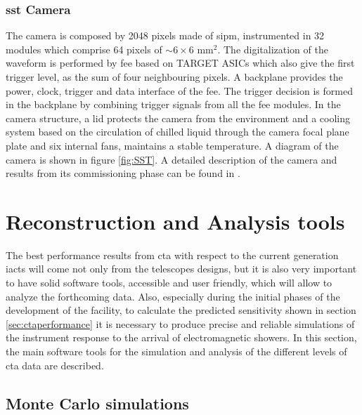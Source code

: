 \documentclass[main.tex]{subfiles}
\begin{document}
\subsubsection{\gls{sst} Camera}

The camera is composed by 2048 pixels made of \gls{sipm}, instrumented in 32 modules which comprise 64 pixels of $\sim 6\times6$ mm$^2$. The digitalization of the waveform is performed by \gls{fee} based on TARGET ASICs \cite{2017TARGETASIC} which also give the first trigger level, as the sum of four neighbouring pixels. A backplane provides the power, clock, trigger and data interface of the \gls{fee}. The trigger decision is formed in the backplane by combining trigger signals from all the \gls{fee} modules. In the camera structure, a lid protects the camera from the environment and a cooling system based on the circulation of chilled liquid through the camera focal plane plate and six internal fans, maintains a stable temperature. A diagram of the camera is shown in figure \ref{fig:SST}. A detailed description of the camera and results from its commissioning phase can be found in \cite{2017CHECcam}.

\section{Reconstruction and Analysis tools} \label{sec:ctaanalysis}

The best performance results from \gls{cta} with respect to the current generation \glspl{iact} will come not only from the telescopes designs, but it is also very important to have solid software tools, accessible and user friendly, which will allow to analyze the forthcoming data. Also, especially during the initial phases of the development of the facility, to calculate the predicted sensitivity shown in section \ref{sec:ctaperformance} it is necessary to produce precise and reliable simulations of the instrument response to the arrival of electromagnetic showers. In this section, the main software tools for the simulation and analysis of the different levels of \gls{cta} data are described. 

\subsection{Monte Carlo simulations}
\end{document}
